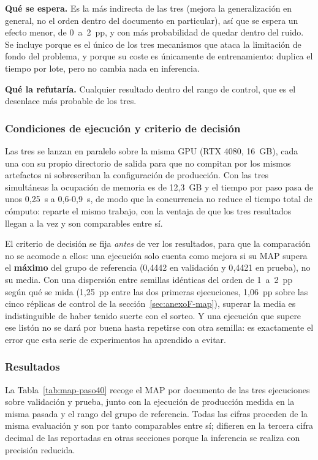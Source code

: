 \textbf{Qué se espera.} Es la más indirecta de las tres (mejora la generalización en general, no el orden dentro del documento en particular), así que se espera un efecto menor, de 0~a~2~pp, y con más probabilidad de quedar dentro del ruido. Se incluye porque es el único de los tres mecanismos que ataca la limitación de fondo del problema, y porque su coste es únicamente de entrenamiento: duplica el tiempo por lote, pero no cambia nada en inferencia.

\textbf{Qué la refutaría.} Cualquier resultado dentro del rango de control, que es el desenlace más probable de los tres.

\subsubsection*{Condiciones de ejecución y criterio de decisión}

Las tres se lanzan en paralelo sobre la misma GPU (RTX 4080, 16~GB), cada una con su propio directorio de salida para que no compitan por los mismos artefactos ni sobrescriban la configuración de producción. Con las tres simultáneas la ocupación de memoria es de 12{,}3~GB y el tiempo por paso pasa de unos 0{,}25~s a 0{,}6-0{,}9~s, de modo que la concurrencia no reduce el tiempo total de cómputo: reparte el mismo trabajo, con la ventaja de que los tres resultados llegan a la vez y son comparables entre sí.

El criterio de decisión se fija \emph{antes} de ver los resultados, para que la comparación no se acomode a ellos: una ejecución solo cuenta como mejora si su MAP supera el \textbf{máximo} del grupo de referencia (0{,}4442 en validación y 0{,}4421 en prueba), no su media. Con una dispersión entre semillas idénticas del orden de 1~a~2~pp según qué se mida (1,25~pp entre las dos primeras ejecuciones, 1,06~pp sobre las cinco réplicas de control de la sección~\ref{sec:anexoF-map}), superar la media es indistinguible de haber tenido suerte con el sorteo. Y una ejecución que supere ese listón no se dará por buena hasta repetirse con otra semilla: es exactamente el error que esta serie de experimentos ha aprendido a evitar.

\subsubsection*{Resultados}

La Tabla~\ref{tab:map-paso40} recoge el MAP por documento de las tres ejecuciones sobre validación y prueba, junto con la ejecución de producción medida en la misma pasada y el rango del grupo de referencia. Todas las cifras proceden de la misma evaluación y son por tanto comparables entre sí; difieren en la tercera cifra decimal de las reportadas en otras secciones porque la inferencia se realiza con precisión reducida.

